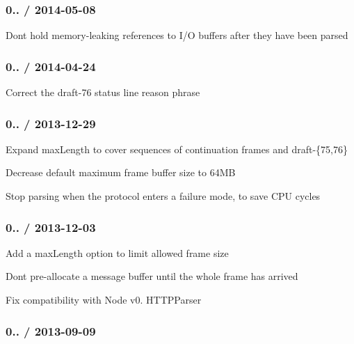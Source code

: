 \subsubsection*{0.. / 2014-\/05-\/08}


\begin{DoxyItemize}
\item Don\textquotesingle{}t hold memory-\/leaking references to I/O buffers after they have been parsed
\end{DoxyItemize}

\subsubsection*{0.. / 2014-\/04-\/24}


\begin{DoxyItemize}
\item Correct the draft-\/76 status line reason phrase
\end{DoxyItemize}

\subsubsection*{0.. / 2013-\/12-\/29}


\begin{DoxyItemize}
\item Expand {\ttfamily max\+Length} to cover sequences of continuation frames and {\ttfamily draft-\/\{75,76\}}
\item Decrease default maximum frame buffer size to 64\+MB
\item Stop parsing when the protocol enters a failure mode, to save C\+PU cycles
\end{DoxyItemize}

\subsubsection*{0.. / 2013-\/12-\/03}


\begin{DoxyItemize}
\item Add a {\ttfamily max\+Length} option to limit allowed frame size
\item Don\textquotesingle{}t pre-\/allocate a message buffer until the whole frame has arrived
\item Fix compatibility with Node v0. {\ttfamily H\+T\+T\+P\+Parser}
\end{DoxyItemize}

\subsubsection*{0.. / 2013-\/09-\/09}


